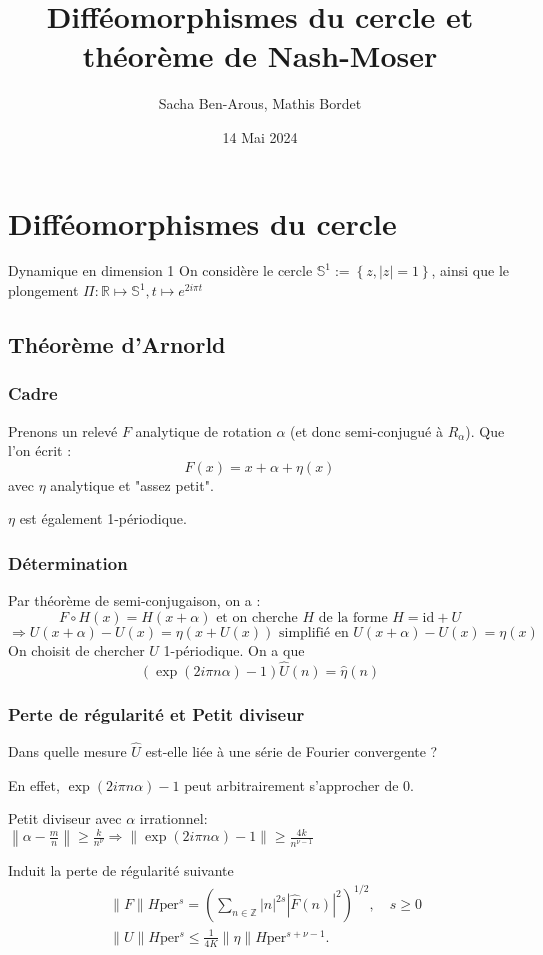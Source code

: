 \documentclass[10pt]{beamer}
\title{Difféomorphismes du cercle et théorème de Nash-Moser}
\date{14 Mai 2024}
\author{Sacha Ben-Arous, Mathis Bordet}
\institute{ENS Paris-Saclay}
\begin{document}
  \maketitle
\begin{frame}
\tableofcontents
\end{frame}  



\section{Difféomorphismes du cercle}
\begin{frame}{Dynamique en dimension 1}
    On considère le cercle $\mathbb{S}^1 := \left\{z, |z|=1 \right\}$, ainsi que le plongement $\Pi : \mathbb{R} \mapsto \mathbb{S}^1, t \mapsto e^{2i\pi t}$
\end{frame}


\subsection*{Théorème d'Arnorld}
\begin{frame}
\frametitle{Cadre}
Prenons un relevé $F$ analytique de rotation $\alpha$ (et donc semi-conjugué à $R_\alpha$). Que l'on écrit :
\[ F(x) = x + \alpha + \eta (x) \]
avec $\eta$ analytique et "assez petit".

$\eta$ est également 1-périodique.
\end{frame}

\begin{frame}
\frametitle{Détermination}
Par théorème de semi-conjugaison, on a :
\[ F \circ H(x) = H( x + \alpha) \text{ et on cherche } H \text{ de la forme } H = \text{id} + U \]
\[ \Rightarrow U(x+ \alpha) - U(x) = \eta (x+U(x)) \text{ simplifié en } U(x+ \alpha) - U(x) = \eta (x) \]
On choisit de chercher \( U \) 1-périodique. On a que 
\[ (\exp(2 i \pi n \alpha)-1)\widehat{U} (n) = \widehat{\eta} (n) \]
\end{frame}

\begin{frame}
\frametitle{Perte de régularité et Petit diviseur}
Dans quelle mesure \( \widehat{U} \) est-elle liée à une série de Fourier convergente ?

En effet, \( \exp(2 i \pi n \alpha)-1 \) peut arbitrairement s'approcher de 0.

Petit diviseur avec \( \alpha \) irrationnel: \( \left\| \alpha - \frac{m}{n} \right\| \geq \frac{k}{n^\nu} \Rightarrow \left\| \exp(2 i \pi n \alpha)-1\right\| \geq \frac{4k}{n^{\nu-1}} \)

Induit la perte de régularité suivante
\[
\begin{aligned}
& \|F\|{H{\text{per}}^s} = \left(\sum_{n \in \mathbb{Z}}|n|^{2 s}|\hat{F}(n)|^2\right)^{1 / 2}, \quad s \geq 0 \\
& \|U\|{H{\text{per}}^s} \leq \frac{1}{4 K}\|\eta\|{H{\text{per}}^{s+\nu-1}} .
\end{aligned}
\]
\end{frame}
\end{document}
